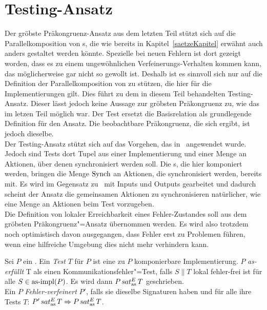 \section{Testing-Ansatz}

Der gröbste Präkongruenz-Ansatz aus dem letzten Teil stützt sich auf die
Parallelkomposition von \MEIO{}s, die wie bereits in
Kapitel~\ref{saetzeKapitel} erwähnt auch anders gestaltet werden könnte.
Spezielle bei neuen Fehlern ist dort gezeigt worden, dass es zu einem
ungewöhnlichen Verfeinerungs-Verhalten kommen kann, das möglicherweise gar
nicht so gewollt ist. Deshalb ist es sinnvoll sich nur auf die Definition der
Parallelkomposition von \EIO{} zu stützen, die hier für die Implementierungen
gilt. Dies führt zu dem in diesem Teil behandelten Testing-Ansatz. Dieser lässt
jedoch keine Aussage zur gröbsten Präkongruenz zu, wie das im letzen Teil
möglich war. Der Test ersetzt die Basisrelation als grundlegende Definition für
den Ansatz. Die beobachtbare Präkongruenz, die sich ergibt, ist jedoch
dieselbe.\\
Der Testing-Ansatz stützt sich auf das Vorgehen, das
in~\cite{Vogler2015FailSem} angewendet wurde. Jedoch sind Tests dort Tupel aus
einer Implementierung und einer Menge an Aktionen, über denen synchronisiert
werden soll. Die \MEIO{}s, die hier komponiert werden, bringen die Menge
$\mathrm{Synch}$ an Aktionen, die synchronisiert werden, bereits mit. Es wird im
Gegensatz zu~\cite{Vogler2015FailSem} mit Inputs und Outputs gearbeitet und
dadurch scheint der Ansatz die gemeinsamen Aktionen zu synchronisieren
natürlicher, wie eine Menge an Aktionen beim Test vorzugeben.\\
Die Definition von lokaler Erreichbarkeit eines Fehler-Zustandes soll aus dem
gröbsten Präkongruenz"=Ansatz übernommen werden. Es wird also trotzdem noch
optimistisch davon ausgegangen, dass Fehler erst zu Problemen führen, wenn eine
hilfreiche Umgebung dies nicht mehr verhindern kann.

\begin{Def}
  \label{KommTestDef}
  Sei $P$ ein \MEIO{}. Ein \emph{Test} $T$ für $P$ ist eine zu $P$ komponierbare
  Implementierung. $P$ \emph{as-erfüllt} T als einen
  Kommunikationsfehler"=Test, falls $S\|T$ lokal fehler-frei ist für alle $S\in
  \mathrm{as}\text{-}\mathrm{impl} (P)$. Es wird dann $P \hspace{0.05cm}sat_\mathrm{as}^E\hspace{0.05cm} T$ geschrieben.\\
  Ein \MEIO{} $P$ \emph{Fehler-verfeinert} $P'$, falls sie dieselbe Signaturen
  haben und für alle ihre Tests $T$: $P'\hspace{0.05cm}sat_\mathrm{as}^E\hspace{0.05cm} T \Rightarrow P\hspace{0.05cm}sat_\mathrm{as}^E\hspace{0.05cm} T$.
\end{Def}

